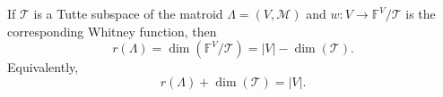 If $\mathcal{T}$ is a Tutte subspace of the matroid $\Lambda = (V, \mathcal{M})$ and $w: V \to \mathbb{F}^V / \mathcal{T}$ is the corresponding Whitney function, then
$$r(\Lambda) = \dim(\mathbb{F}^V / \mathcal{T}) = |V| - \dim(\mathcal{T}).$$
Equivalently,
$$r(\Lambda) + \dim(\mathcal{T}) = |V|.$$
